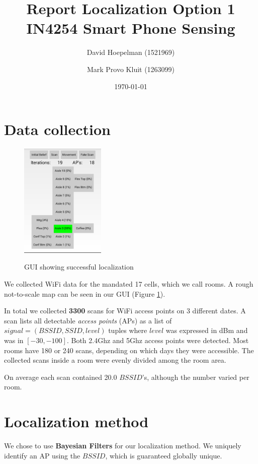 \documentclass[a4paper,10pt,twoside]{IEEEtran}
\title{\huge{\textbf{Report Localization Option 1}\\IN4254 Smart Phone Sensing}}
\date{\today}
\author{David Hoepelman (1521969) \and Mark Provo Kluit (1263099)}
\begin{document}
\maketitle

\section{Data collection}
\label{sec:localization-method}

\begin{figure}
  \centering
    \includegraphics[width=0.36\textwidth]{screenshot}
    \label{fig:screenshot}
    \caption{GUI showing successful localization}
\end{figure}

We collected WiFi data for the mandated 17 cells, which we call rooms.
A rough not-to-scale map can be seen in our GUI (Figure \ref{fig:screenshot}).

In total we collected \textbf{3300} scans for WiFi access points on 3 different dates.
A scan lists all detectable \emph{access points} (APs) as a list of $signal=(BSSID, SSID, level)$ tuples where $level$ was expressed in dBm and was in $[-30,-100]$.
Both 2.4Ghz and 5Ghz access points were detected.
Most rooms have 180 or 240 scans, depending on which days they were accessible.
The collected scans inside a room were evenly divided among the room area.

On average each scan contained 20.0 $BSSID$'s, although the number varied per room.
\newpage
\section{Localization method}
\label{sec:data}

We chose to use \textbf{Bayesian Filters} for our localization method. We uniquely identify an AP using the $BSSID$, which is guaranteed globally unique.
\end{document}
